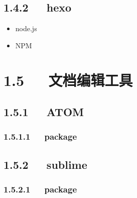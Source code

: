 \documentclass[letterpaper,12pt,english]{sphinxmanual}
\begin{document}
\subsection{1.4.2   hexo}
\label{\detokenize{001software/001install/001._u7f51_u7ad9/_u7f51_u7ad9_u76f8_u5173:hexo}}\begin{itemize}
\item {} 
node.js

\item {} 
NPM

\end{itemize}


\section{1.5   文档编辑工具}
\label{\detokenize{001software/001install/001._u7f51_u7ad9/_u7f51_u7ad9_u76f8_u5173:id5}}

\subsection{1.5.1   ATOM}
\label{\detokenize{001software/001install/001._u7f51_u7ad9/_u7f51_u7ad9_u76f8_u5173:atom}}

\subsubsection{1.5.1.1   package}
\label{\detokenize{001software/001install/001._u7f51_u7ad9/_u7f51_u7ad9_u76f8_u5173:package}}

\subsection{1.5.2   sublime}
\label{\detokenize{001software/001install/001._u7f51_u7ad9/_u7f51_u7ad9_u76f8_u5173:sublime}}

\subsubsection{1.5.2.1   package}
\label{\detokenize{001software/001install/001._u7f51_u7ad9/_u7f51_u7ad9_u76f8_u5173:package-1}}\label{\detokenize{001software/001install/001._u7f51_u7ad9/_u7f51_u7ad9_u76f8_u5173:id6}}
\end{document}
